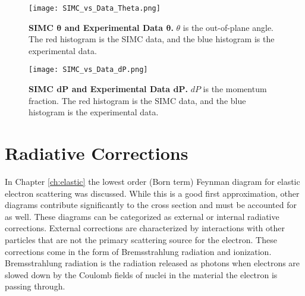 \begin{figure}[!ht]
\begin{center}
\texttt{[image: SIMC\_vs\_Data\_Theta.png]}
\end{center}
\caption[SIMC $\theta$ and Experimental Data $\theta$]{
{\bf{SIMC $\boldsymbol{\theta}$ and Experimental Data $\boldsymbol{\theta}$.}} $\theta$ is the out-of-plane angle. The red histogram is the SIMC data, and the blue histogram is the experimental data.}
\label{fig:simc_theta}
\end{figure}


\begin{figure}[!ht]
\begin{center}
\texttt{[image: SIMC\_vs\_Data\_dP.png]}
\end{center}
\caption[SIMC $dP$ and Experimental Data $dP$]{
{\bf{SIMC $\boldsymbol{dP}$ and Experimental Data $\boldsymbol{dP}$.}} $dP$ is the momentum fraction. The red histogram is the SIMC data, and the blue histogram is the experimental data.}
\label{fig:simc_dp}
\end{figure}

\section{Radiative Corrections}
\label{sec:rc}

In Chapter \ref{ch:elastic} the lowest order (Born term) Feynman diagram for elastic electron scattering was discussed. While this is a good first approximation, other diagrams contribute significantly to the cross section and must be accounted for as well. These diagrams can be categorized as external or internal radiative corrections. External corrections are characterized by interactions with other particles that are not the primary scattering source for the electron. These corrections come in the form of Bremsstrahlung radiation and ionization. Bremsstrahlung radiation is the radiation released as photons when electrons are slowed down by the Coulomb fields of nuclei in the material the electron is passing through. 


